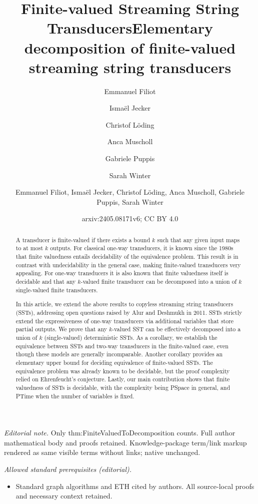 \documentclass{article}
\author{Emmanuel Filiot \and Ismaël Jecker \and Christof Löding \and Anca Muscholl \and Gabriele Puppis \and Sarah Winter}\date{}
\title{Finite-valued Streaming String Transducers}
\title{Elementary decomposition of finite-valued streaming string transducers}
\author{Emmanuel Filiot, Ismaël Jecker, Christof Löding, Anca Muscholl, Gabriele Puppis, Sarah Winter}
\date{arxiv:2405.08171v6; CC BY 4.0}
\begin{document}
\maketitle
\noindent\textit{Editorial note.} Only thm:FiniteValuedToDecomposition counts. Full author mathematical body and proofs retained. Knowledge-package term/link markup rendered as same visible terms without links; native unchanged.\par\medskip
\noindent\textit{Allowed standard prerequisites (editorial).}\begin{itemize}
\item Standard graph algorithms and ETH cited by authors. All source-local proofs and necessary context retained.
\end{itemize}\medskip

\maketitle


\begin{abstract}
       A  transducer is finite-valued if there exists a bound
    $k$ such that any given
    input maps to at most $k$ outputs. For classical
    one-way transducers, it is known since the 1980s that
    finite valuedness entails decidability of the equivalence
    problem. This result is in contrast with undecidability in the
    general case, making finite-valued transducers
    very appealing. For one-way transducers it is also known that
    finite valuedness itself is decidable and that any
    $k$-valued finite transducer can be decomposed into a union of $k$
    single-valued finite transducers. 


    In this article, we extend the above results to copyless streaming string
    transducers (SSTs), addressing open questions raised by Alur and
    Deshmukh in 2011. SSTs strictly extend the expressiveness of
    one-way transducers via additional variables that store
    partial outputs. We prove that any $k$-valued SST can be
    effectively decomposed into a union of $k$ (single-valued)
    deterministic SSTs. As a corollary, we establish the equivalence
    between SSTs and two-way transducers in the finite-valued case, even though these models are generally incomparable. Another corollary provides an elementary upper bound for
    deciding equivalence of finite-valued SSTs. The equivalence problem was already
    known to be decidable, but the proof complexity relied
    on Ehrenfeucht's
    conjecture. Lastly, our main contribution shows that finite valuedness of SSTs is
    decidable, with the complexity  being {\upshape\sc PSpace} in general, and  {\upshape\sc PTime} when the
    number of variables is fixed.  
\end{abstract}
\end{document}
